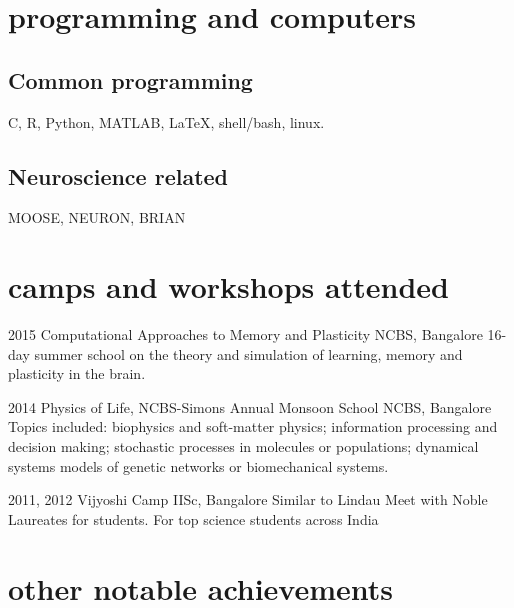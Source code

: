 \documentclass[11pt,print]{friggeri-cv}%
\begin{document}
\section{programming and computers}
\subsection{Common programming}
C,
 R, 
 Python,
    MATLAB,
{    \lotsoftextfont \LaTeX},
    shell/bash,
    linux.
\subsection{Neuroscience related}
MOOSE, NEURON, BRIAN 

\pagebreak

\section{camps and workshops attended}

\begin{entrylist}
  \entryy
    {2015}
    {Computational Approaches to Memory and Plasticity }
    {NCBS, Bangalore}
    {16-day summer school on the theory and simulation of learning, memory and plasticity in the brain.}    
\end{entrylist}
\begin{entrylist}
  \entryy
    {2014}
    {Physics of Life, NCBS-Simons Annual Monsoon School}
    {NCBS, Bangalore}
    {Topics included: biophysics and soft-matter physics; information processing and decision making; stochastic processes in molecules or populations; dynamical systems models of genetic networks or biomechanical systems.}    
\end{entrylist}
\begin{entrylist}
  \entryy
    {2011, 2012}
    {Vijyoshi Camp}
    {IISc, Bangalore}
    {Similar to Lindau Meet with Noble Laureates for students. For top  science students across India }
\end{entrylist}

\section{other notable achievements}
\end{document}
